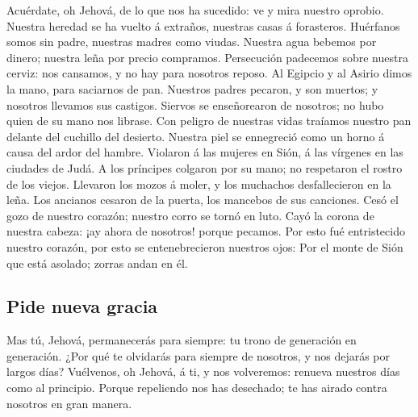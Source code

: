  Acuérdate, oh Jehová, de lo que nos ha sucedido: ve y mira
nuestro oprobio.  Nuestra heredad se ha vuelto á extraños,
nuestras casas á forasteros.  Huérfanos somos sin padre,
nuestras madres como viudas.  Nuestra agua bebemos por
dinero; nuestra leña por precio compramos.  Persecución
padecemos sobre nuestra cerviz: nos cansamos, y no hay para nosotros
reposo.  Al Egipcio y al Asirio dimos la mano, para
saciarnos de pan.  Nuestros padres pecaron, y son muertos; y
nosotros llevamos sus castigos.  Siervos se enseñorearon de
nosotros; no hubo quien de su mano nos librase.  Con peligro
de nuestras vidas traíamos nuestro pan delante del cuchillo del
desierto.  Nuestra piel se ennegreció como un horno á causa
del ardor del hambre.  Violaron á las mujeres en Sión, á
las vírgenes en las ciudades de Judá.  A los príncipes
colgaron por su mano; no respetaron el rostro de los viejos.
 Llevaron los mozos á moler, y los muchachos desfallecieron
en la leña.  Los ancianos cesaron de la puerta, los
mancebos de sus canciones.  Cesó el gozo de nuestro
corazón; nuestro corro se tornó en luto.  Cayó la corona de
nuestra cabeza: ¡ay ahora de nosotros! porque pecamos.  Por
esto fué entristecido nuestro corazón, por esto se entenebrecieron
nuestros ojos:  Por el monte de Sión que está asolado;
zorras andan en él.

\hypertarget{pide-nueva-gracia}{%
\subsection{Pide nueva gracia}\label{pide-nueva-gracia}}

 Mas tú, Jehová, permanecerás para siempre: tu trono de
generación en generación.  ¿Por qué te olvidarás para
siempre de nosotros, y nos dejarás por largos días? 
Vuélvenos, oh Jehová, á ti, y nos volveremos: renueva nuestros días como
al principio.  Porque repeliendo nos has desechado; te has
airado contra nosotros en gran manera.
